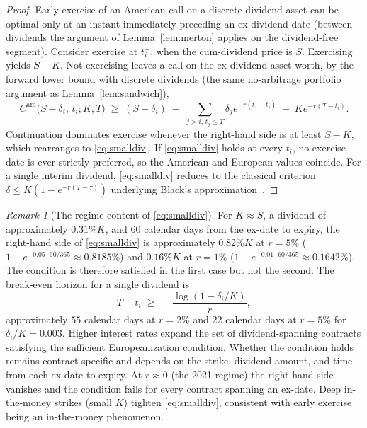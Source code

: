 \documentclass[11pt]{article}
\theoremstyle{remark}
\newtheorem{remark}{Remark}
\newcommand{\Cam}{C^{\mathrm{am}}}
\begin{document}
\begin{proof}
Early exercise of an American call on a discrete-dividend asset can be optimal only at an instant immediately preceding an ex-dividend date (between dividends the argument of Lemma~\ref{lem:merton} applies on the dividend-free segment). Consider exercise at $t_i^-$, when the cum-dividend price is $S$. Exercising yields $S-K$. Not exercising leaves a call on the ex-dividend asset worth, by the forward lower bound with discrete dividends (the same no-arbitrage portfolio argument as Lemma~\ref{lem:sandwich}),
\[
\Cam\big(S-\delta_i,\,t_i;K,T\big)\;\ge\;(S-\delta_i)\;-\;\sum_{j>i,\,t_j\le T}\delta_j e^{-r(t_j-t_i)}\;-\;Ke^{-r(T-t_i)} .
\]
Continuation dominates exercise whenever the right-hand side is at least $S-K$, which rearranges to \eqref{eq:smalldiv}. If \eqref{eq:smalldiv} holds at every $t_i$, no exercise date is ever strictly preferred, so the American and European values coincide. For a single interim dividend, \eqref{eq:smalldiv} reduces to the classical criterion $\delta\le K(1-e^{-r(T-\tau)})$ underlying Black's approximation~\cite{black1975}.
\end{proof}

\begin{remark}[The regime content of \eqref{eq:smalldiv}]\label{rem:regime}
For $K\approx S$, a dividend of approximately $0.31\%K$, and 60 calendar days from the ex-date to expiry, the right-hand side of \eqref{eq:smalldiv} is approximately $0.82\%K$ at $r=5\%$ ($1-e^{-0.05\cdot 60/365}\approx0.8185\%$) and $0.16\%K$ at $r=1\%$ ($1-e^{-0.01\cdot 60/365}\approx0.1642\%$). The condition is therefore satisfied in the first case but not the second. The break-even horizon for a single dividend is
\[
T-t_i\;\ge\;-\frac{\log(1-\delta_i/K)}{r},
\]
approximately $55$ calendar days at $r=2\%$ and $22$ calendar days at $r=5\%$ for $\delta_i/K=0.003$. Higher interest rates expand the set of dividend-spanning contracts satisfying the sufficient Europeanization condition. Whether the condition holds remains contract-specific and depends on the strike, dividend amount, and time from each ex-date to expiry. At $r\approx0$ (the 2021 regime) the right-hand side vanishes and the condition fails for every contract spanning an ex-date. Deep in-the-money strikes (small $K$) tighten \eqref{eq:smalldiv}, consistent with early exercise being an in-the-money phenomenon.
\end{remark}
\end{document}
